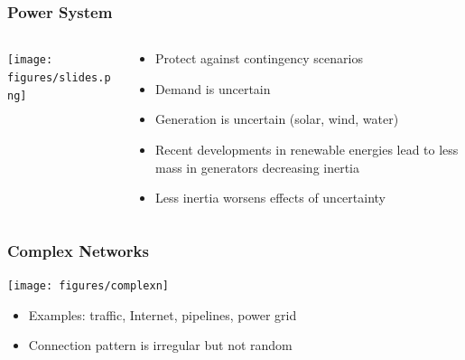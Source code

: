 \begin{frame}
  \frametitle{Power System}
  \begin{columns}
    \begin{column}{0.45\textwidth}
      \texttt{[image: figures/slides.png]}
    \end{column}
    \begin{column}{0.45\textwidth}
      \begin{center}
      \end{center}
      \begin{itemize}
        \item Protect against contingency scenarios
        \item Demand is uncertain
        \item Generation is uncertain (solar, wind, water)
        \item Recent developments in renewable energies lead to less mass in generators decreasing inertia
        \item Less inertia worsens effects of uncertainty
      \end{itemize}
    \end{column}
  \end{columns}
\end{frame}

\begin{frame}
  \frametitle{Complex Networks}
  \texttt{[image: figures/complexn]}
  \begin{itemize}
    \item Examples: traffic, Internet, pipelines, power grid
    \item Connection pattern is irregular but not random
  \end{itemize}
\end{frame}

